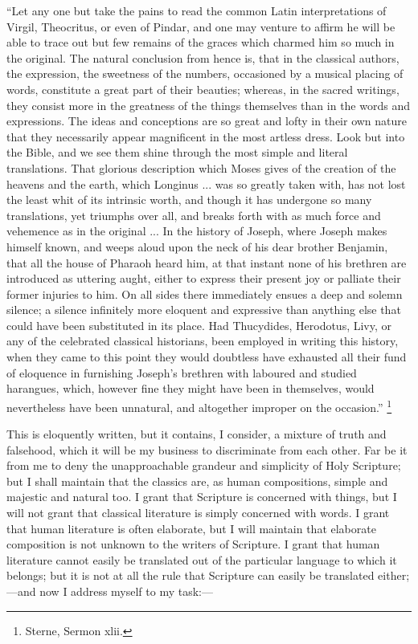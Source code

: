 ``Let any one but take the pains to read the common Latin
interpretations of Virgil, Theocritus, or even of Pindar, and one may
venture to affirm he will be able to trace out but few remains of the
graces which charmed him so much in the original. The natural
conclusion from hence is, that in the classical authors, the
expression, the sweetness of the numbers, occasioned by a musical
placing of words, constitute a great part of their beauties; whereas,
in the sacred writings, they consist more in the greatness of the
things themselves than in the words and expressions. The ideas and
conceptions are so great and lofty in their own nature that they
necessarily appear magnificent in the most artless dress. Look but
into the Bible, and we see them shine through the most simple and
literal translations. That glorious description which Moses gives of
the creation of the heavens and the earth, which Longinus ... was so
greatly taken with, has not lost the least whit of its intrinsic
worth, and though it has undergone so many translations, yet triumphs
over all, and breaks forth with as much force and vehemence as in the
original ... In the history of Joseph, where Joseph makes himself
known, and weeps aloud upon the neck of his dear brother Benjamin,
that all the house of Pharaoh heard him, at that instant none of his
brethren are introduced as uttering aught, either to express
their present joy or palliate their former injuries to him. On all
sides there immediately ensues a deep and solemn silence; a silence
infinitely more eloquent and expressive than anything else that could
have been substituted in its place. Had Thucydides, Herodotus, Livy,
or any of the celebrated classical historians, been employed in
writing this history, when they came to this point they would
doubtless have exhausted all their fund of eloquence in furnishing
Joseph's brethren with laboured and studied harangues, which, however
fine they might have been in themselves, would nevertheless have been
unnatural, and altogether improper on the occasion.'' \footnote{Sterne, Sermon xlii.}

This is eloquently written, but it contains, I consider, a mixture
of truth and falsehood, which it will be my business to discriminate
from each other. Far be it from me to deny the unapproachable grandeur
and simplicity of Holy Scripture; but I shall maintain that the
classics are, as human compositions, simple and majestic and natural
too. I grant that Scripture is concerned with things, but I will not
grant that classical literature is simply concerned with words. I
grant that human literature is often elaborate, but I will maintain
that elaborate composition is not unknown to the writers of Scripture.
I grant that human literature cannot easily be translated out of the
particular language to which it belongs; but it is not at all the rule
that Scripture can easily be translated either;—and now I address
myself to my task:—

